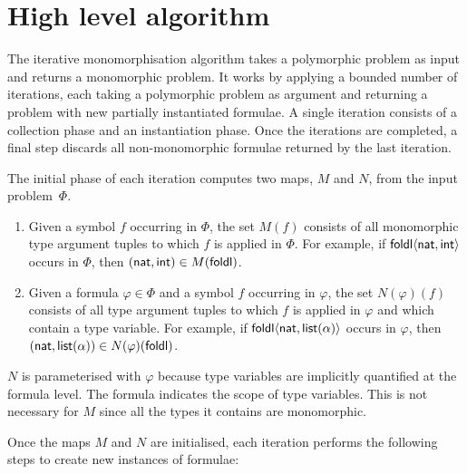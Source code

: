 \documentclass[runningheads]{llncs}
\begin{document}
\section{High level algorithm}
\label{sec:high level-algorithm}

The iterative monomorphisation algorithm takes a polymorphic problem as input and returns a monomorphic problem. It works by applying a bounded number of iterations, each taking a polymorphic problem as argument and returning a problem with new partially instantiated formulae. A single iteration consists of a collection phase and an instantiation phase. Once the iterations are completed, a final step discards all non-monomorphic formulae returned by the last iteration.

The initial phase of each iteration computes two maps, \(M\) and \(N\), from the input problem~$\Phi$.
%
\begin{enumerate}
\item[\labelitemi] Given a symbol \(f\) occurring in \(\Phi\), the set \(M(f)\) consists of all monomorphic type argument tuples to which \(f\) is applied in \(\Phi\). For example, if \(\textsf{foldl}\langle \textsf{nat}, \textsf{int}\rangle\) occurs in \(\Phi\), then \((\textsf{nat}, \textsf{int}) \in M(\textsf{foldl}) \).

\item[\labelitemi] Given a formula \(\varphi \in \Phi\) and a symbol \(f\) occurring in \(\varphi\), the set \(N(\varphi)(f)\) consists of all type argument tuples to which \(f\) is applied in \(\varphi\) and which contain a type variable. For example, if \(\textsf{foldl}\langle \textsf{nat}, \textsf{list}(\alpha)\rangle\) occurs in \(\varphi\), then \((\textsf{nat}, \textsf{list}(\alpha)) \in N(\varphi)(\textsf{foldl}) \).
\end{enumerate}

\(N\) is parameterised with \(\varphi\) because type variables are implicitly quantified at the formula level. The formula indicates the scope of type variables. This is not necessary for \(M\) since all the types it contains are monomorphic.

Once the maps \(M\) and \(N\) are initialised, each iteration performs the following steps to create new instances of formulae:
\end{document}
